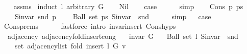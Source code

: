 \begin{isabellebody}
%
\isadelimproof
\ \ %
\endisadelimproof
%
\isatagproof
{}\isamarkupfalse%
\ assms\isanewline
{}\isamarkupfalse%
\ {\isacharparenleft}{\kern0pt}induct\ l\ arbitrary{\isacharcolon}{\kern0pt}\ G{\isacharparenright}{\kern0pt}\isanewline
\ \ \isamarkupfalse%
\ Nil\isanewline
\ \ \isamarkupfalse%
\ {\isacharquery}{\kern0pt}case\isanewline
\ \ \ \ \isamarkupfalse%
\ simp\isanewline
{}\isamarkupfalse%
\isanewline
\ \ \isamarkupfalse%
\ {\isacharparenleft}{\kern0pt}Cons\ p\ ps{\isacharparenright}{\kern0pt}\isanewline
\ \ \isamarkupfalse%
\isanewline
\ \ \ \ {\isachardoublequoteopen}S{\isachardot}{\kern0pt}invar\ {\isacharparenleft}{\kern0pt}snd\ p{\isacharparenright}{\kern0pt}{\isachardoublequoteclose}\isanewline
\ \ \ \ {\isachardoublequoteopen}Ball\ {\isacharparenleft}{\kern0pt}set\ ps{\isacharparenright}{\kern0pt}\ {\isacharparenleft}{\kern0pt}S{\isachardot}{\kern0pt}invar\ {\isasymcirc}\ snd{\isacharparenright}{\kern0pt}{\isachardoublequoteclose}\isanewline
\ \ \ \ \isamarkupfalse%
\ simp{\isacharplus}{\kern0pt}\isanewline
\ \ \isamarkupfalse%
{\isacharquery}{\kern0pt}case\isanewline
\ \ \ \ \isamarkupfalse%
\ Cons{\isachardot}{\kern0pt}prems{\isacharparenleft}{\kern0pt}{}{\isacharparenright}{\kern0pt}\isanewline
\ \ \ \ \isamarkupfalse%
\ {\isacharparenleft}{\kern0pt}fastforce\ intro{\isacharcolon}{\kern0pt}\ invar{\isacharunderscore}{\kern0pt}insert{\isacharunderscore}{\kern0pt}{}\ Cons{\isachardot}{\kern0pt}hyps{\isacharparenright}{\kern0pt}\isanewline
{}\isamarkupfalse%
%
\endisatagproof
{\isafoldproof}%
%
\isadelimproof
\isanewline
%
\endisadelimproof
\isanewline
{}\isamarkupfalse%
\ {\isacharparenleft}{\kern0pt}\ adjacency{\isacharparenright}{\kern0pt}\ adjacency{\isacharunderscore}{\kern0pt}fold{\isacharunderscore}{\kern0pt}insert{\isacharunderscore}{\kern0pt}{}{\isacharunderscore}{\kern0pt}cong{\isacharcolon}{\kern0pt}\isanewline
\ \ \ {\isachardoublequoteopen}invar\ G{\isachardoublequoteclose}\isanewline
\ \ \ {\isachardoublequoteopen}Ball\ {\isacharparenleft}{\kern0pt}set\ l{\isacharparenright}{\kern0pt}\ {\isacharparenleft}{\kern0pt}S{\isachardot}{\kern0pt}invar\ {\isasymcirc}\ snd{\isacharparenright}{\kern0pt}{\isachardoublequoteclose}\isanewline
\ \ \isanewline
\ \ \ \ {\isachardoublequoteopen}set\ {\isacharparenleft}{\kern0pt}adjacency{\isacharunderscore}{\kern0pt}list\ {\isacharparenleft}{\kern0pt}fold\ insert{\isacharunderscore}{\kern0pt}{}\ l\ G{\isacharparenright}{\kern0pt}\ v{\isacharparenright}{\kern0pt}\ {\isacharequal}{\kern0pt}\isanewline

\end{isabellebody}
